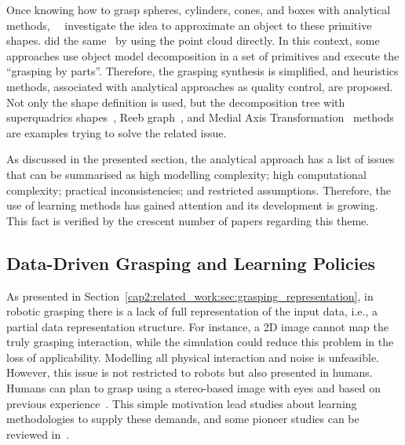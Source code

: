
Once knowing how to grasp spheres, cylinders, cones, and boxes with analytical methods,~\citeauthor{Miller2003}~\cite{Miller2003} investigate the idea to approximate an object to these primitive shapes. \citeauthor{Jain2016} did the same~\cite{Jain2016} by using the point cloud directly. In this context, some approaches use object model decomposition in a set of primitives and execute the ``grasping by parts''. Therefore, the grasping synthesis is simplified, and heuristics methods, associated with analytical approaches as quality control, are proposed. Not only the shape definition is used, but the decomposition tree with superquadrics shapes~\cite{Goldfeder2007}, Reeb graph~\cite{Aleotti2012}, and Medial Axis Transformation~\cite{Przybylski2011} methods are examples trying to solve the related issue. 



As discussed in the presented section, the analytical approach has a list of issues that can be summarised as high modelling complexity; high computational complexity; practical inconsistencies; and restricted assumptions. Therefore, the use of learning methods has gained attention and its development is growing. This fact is verified by the crescent number of papers regarding this theme.

\subsection{Data-Driven Grasping and Learning Policies} 
\label{cap2:related_work:sec:grasping_approaches:subsec:learning_review}

As presented in Section~\ref{cap2:related_work:sec:grasping_representation}, in robotic grasping there is a lack of full representation of the input data, i.e., a partial data representation structure. For instance, a 2D image cannot map the truly grasping interaction, while the simulation could reduce this problem in the loss of applicability. Modelling all physical interaction and noise is unfeasible. However, this issue is not restricted to robots but also presented in humans. Humans can plan to grasp using a stereo-based image with eyes and based on previous experience~\cite{castiello2005neuroscience}. This simple motivation lead studies about learning methodologies to supply these demands, and some pioneer studies can be reviewed in~\cite{Oztop2001, Wheeler2002, Rezzoug2002}.

